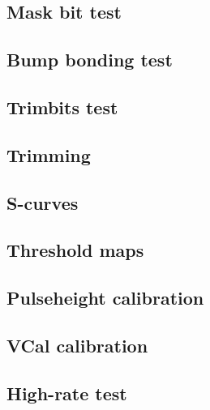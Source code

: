 \subsection{Mask bit test}
\label{ss:masktest}

\subsection{Bump bonding test}
\label{ss:bbtest}

\subsection{Trimbits test}
\label{ss:trimbits}

\subsection{Trimming}
\label{ss:trimming}

\subsection{S-curves}
\label{ss:scurves}

\subsection{Threshold maps}
\label{ss:thrmaps}


\subsection{Pulseheight calibration}
\label{ss:phcalibration}

\subsection{VCal calibration}
\label{ss:vcalcal}

\subsection{High-rate test}
\label{ss:hrmaps}


